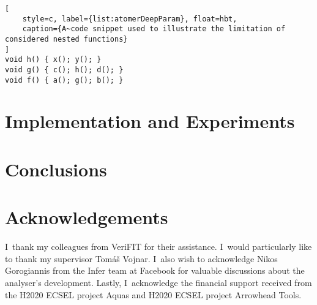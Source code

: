 \documentclass{ExcelAtFIT}
\theoremstyle{definition}
\begin{document}
\begin{lstlisting}[
    style=c, label={list:atomerDeepParam}, float=hbt,
    caption={A~code snippet used to illustrate the limitation of considered nested functions}
]
void h() { x(); y(); }
void g() { c(); h(); d(); }
void f() { a(); g(); b(); }
\end{lstlisting}


\section{Implementation and Experiments}
\label{sec:exp}



\section{Conclusions}
\label{sec:conc}



\section*{Acknowledgements}
I~thank my colleagues from VeriFIT for their assistance. I~would particularly like to thank my supervisor Tomáš Vojnar. I~also wish to acknowledge Nikos Gorogiannis from the Infer team at Facebook for valuable discussions about the analyser’s development. Lastly, I~acknowledge the financial support received from the H2020 ECSEL project Aquas and H2020 ECSEL project Arrowhead Tools.






\end{document}
